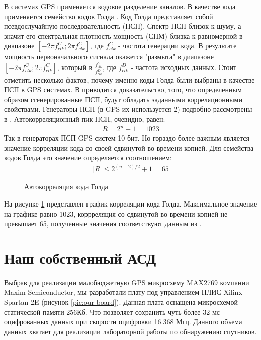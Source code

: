 \documentclass[a4paper,12pt]{article}
\numberwithin{table}{section}
\begin{document}
В системах GPS применяется кодовое разделение каналов. В качестве кода применяется семейство кодов Голда \cite{gold-ieee}.
Код Голда представляет собой псевдослучайную последовательность (ПСП). Спектр ПСП близок к шуму, а значит его
спектральная плотность мощность (СПМ) близка к равномерной в диапазоне ${[-2\pi{f_{clk}^{C}};2\pi{f_{clk}^{C}}]}$, где
${f_{clk}^{C}}$ - частота генерации кода. В результате мощность первоначального сигнала окажется "размыта" в диапазоне 
${[-2\pi{f_{clk}^{C}};2\pi{f_{clk}^{C}}]}$, который в ${\frac{f_{clk}^{C}}{f_{clk}^{D}}}$, где ${f_{clk}^{D}}$ - частота
исходных данных. Стоит отметить несколько фактов, почему именно коды Голда были выбраны в качестве ПСП в GPS системах. 
В \cite{gold-ieee} приводится доказательство, того, что определенным образом сгенерированные ПСП, будут обладать заданными
корреляционными свойствами. Генераторы ПСП (в GPS их используется 2) подробно рассмотрены в \cite{tsui, akos-book}. 
Автокорреляционный пик ПСП, очевидно, равен:
\begin{eqnarray}
	R = 2^n -1 = 1023 
\label{eq:ca_peak}
\end{eqnarray}
Так в генераторах ПСП GPS систем 10 бит. Но гораздо более важным является значение корреляции кода со своей сдвинутой во
времени копией. Для семейства кодов Голда это значение определяется соотношением:
\begin{eqnarray}
	\left|{R}\right| \leq 2^{(n+2)/2} + 1 = 65
\label{eq:ca_peak}
\end{eqnarray}

\begin{figure}[h]
\begin{center}
\end{center}
\caption{Автокорреляция кода Голда}
\label{pic:gold}
\end{figure}
На рисунке \ref{pic:gold} представлен график корреляции кода Голда. Максимальное значение на графике равно 1023, коррреляция 
со сдвинутой во времени копией не превышает 65, полученные значения соответствуют данным из \cite{gold-ieee}.

\section{Наш собственный АСД}
Выбрав для реализации малобюджетную GPS микросхему MAX2769 компании Maxim Semiconductor, мы разработали плату под управлением ПЛИС Xilinx Spartan 2E
(рисунок \ref{pic:our-board}).
Данная плата оснащена микросхемой статической памяти 256Кб.
Что позволяет сохранить чуть более 32 мс оцифрованных данных при скорости оцифровки 16.368 Мгц.
Данного объема данных хватает для реализации лабораторной работы по обнаружению спутников.
\end{document}
